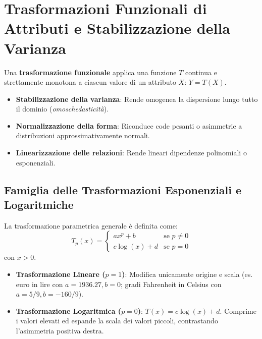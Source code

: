 \FloatBarrier
\section{Trasformazioni Funzionali di Attributi e Stabilizzazione della Varianza}
\label{sec:dm-functional-transformations}

Una \textbf{trasformazione funzionale} applica una funzione $T$ continua e strettamente monotona a ciascun valore di un attributo $X$: $Y = T(X)$.
\begin{itemize}[noitemsep]
    \item \textbf{Stabilizzazione della varianza}: Rende omogenea la dispersione lungo tutto il dominio (\textit{omoschedasticità}).
    \item \textbf{Normalizzazione della forma}: Riconduce code pesanti o asimmetrie a distribuzioni approssimativamente normali.
    \item \textbf{Linearizzazione delle relazioni}: Rende lineari dipendenze polinomiali o esponenziali.
\end{itemize}

\FloatBarrier
\subsection{Famiglia delle Trasformazioni Esponenziali e Logaritmiche}
La trasformazione parametrica generale è definita come:
\begin{equation}
    T_p(x) = \begin{cases}
        a x^p + b & \text{se } p \neq 0 \\
        c \log(x) + d & \text{se } p = 0
    \end{cases}
\end{equation}
con $x > 0$.
\begin{itemize}
    \item \textbf{Trasformazione Lineare ($p = 1$)}: Modifica unicamente origine e scala (es. euro in lire con $a=1936.27, b=0$; gradi Fahrenheit in Celsius con $a=5/9, b=-160/9$).
    \item \textbf{Trasformazione Logaritmica ($p = 0$)}: $T(x) = c\log(x) + d$. Comprime i valori elevati ed espande la scala dei valori piccoli, contrastando l'asimmetria positiva destra.
\end{itemize}

